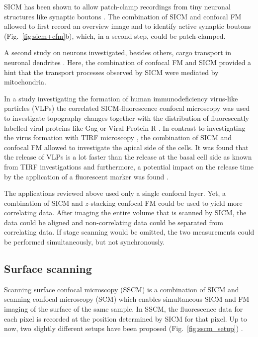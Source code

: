 SICM has been shown to allow patch-clamp recordings from tiny neuronal
structures like synaptic boutons \cite{Novak2013}. The combination of SICM and
confocal FM allowed to first record an overview image and to identify active
synaptic boutons (Fig.~\ref{fig:sicm+cfm}b), which, in a second step, could be
patch-clamped.

A second study on neurons investigated, besides others, cargo transport in
neuronal dendrites \cite{Takahashi2019}. Here, the combination of
confocal FM and SICM provided a hint that the transport processes observed by
SICM were mediated by mitochondria.


In a study investigating the formation of human immunodeficiency virus-like
particles (VLPs) the correlated SICM-fluorescence confocal microscopy was used
to investigate topography changes together with the distribution of
fluorescently labelled viral proteins like Gag or Viral Protein R
\cite{Bednarska2020}. In contrast to investigating the virus formation with
TIRF microscopy \cite{Jouvenet2008}, the combination of SICM and confocal FM
allowed to investigate the apical side of the cells. It was found that the
release of VLPs is a lot faster than the release at the basal cell side as
known from TIRF investigations and furthermore, a potential impact on the
release time by the application of a fluorescent marker was found
\cite{Bednarska2020}.

The applications reviewed above used only a single confocal layer. Yet,
a combination of SICM and $z$-stacking confocal FM could be used to yield more
correlating data. After imaging the entire volume that is scanned by SICM, the
data could be aligned and non-correlating data could be separated from
correlating data. If stage scanning would be omitted, the two measurements
could be performed simultaneously, but not synchronously.  


\subsection{Surface scanning}

Scanning surface confocal microscopy (SSCM) \cite{Gorelik2002a} is a
combination of SICM and scanning confocal microscopy (SCM) which enables
simultaneous SICM and FM imaging of the surface of the same sample. In SSCM,
the fluorescence data for each pixel is recorded at the position determined by
SICM for that pixel. Up to now, two slightly different setups have been proposed
(Fig.~\ref{fig:sscm_setup}) \cite{Gorelik2002a,Shevchuk2013}.

